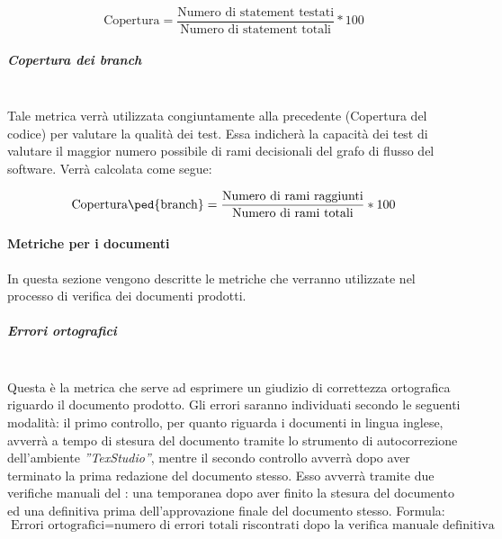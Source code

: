 \begin{displaymath}
	\mbox{Copertura} =\frac{\mbox{Numero di statement testati}}{\mbox{Numero di statement totali}} * 100
\end{displaymath}	


\subparagraph{Copertura dei branch}
~\\Tale metrica verrà utilizzata congiuntamente alla precedente (Copertura del codice) per valutare la qualità dei test. Essa indicherà la capacità dei test di valutare il maggior numero possibile di rami decisionali del grafo di flusso del software. Verrà calcolata come segue:

\begin{displaymath}
	\mbox{Copertura\ped{branch}} =\frac{\mbox{Numero di rami raggiunti}}{\mbox{Numero di rami totali}} * 100
\end{displaymath}	

\paragraph{Metriche per i documenti}
\label{AppB:metricheDoc}
In questa sezione vengono descritte le metriche che verranno utilizzate nel processo di verifica dei documenti prodotti.
\subparagraph{Errori ortografici}
\label{AppB:ErroriOrtografici}
~\\Questa è la metrica che serve ad esprimere un giudizio di correttezza ortografica riguardo il documento prodotto. Gli errori saranno individuati secondo le seguenti modalità:
il primo controllo, per quanto riguarda i documenti in lingua inglese, avverrà a tempo di stesura del documento tramite lo strumento di autocorrezione dell'ambiente \emph{''TexStudio''}, mentre il secondo controllo avverrà dopo aver terminato la prima redazione del documento stesso. Esso avverrà tramite due verifiche manuali del \ver{}: una temporanea dopo aver finito la stesura del documento ed una definitiva prima dell'approvazione finale del documento stesso.
\newline Formula:
\begin{displaymath}
	\mbox{Errori ortografici}= {\mbox{numero di errori totali riscontrati dopo la verifica manuale definitiva}}
\end{displaymath}

